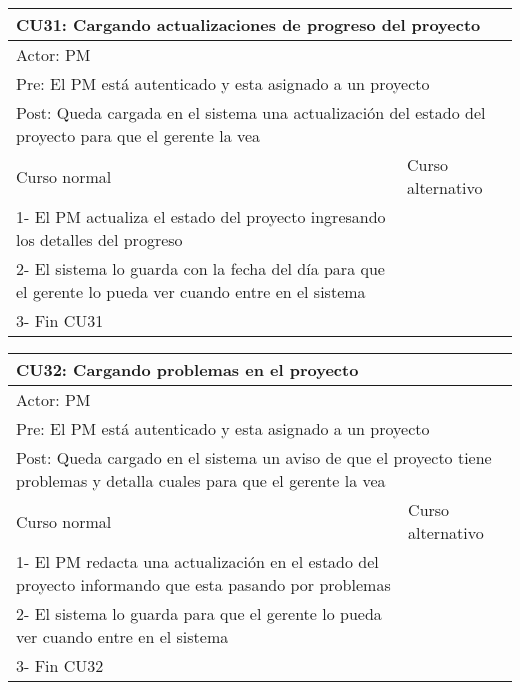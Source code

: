 \begin{table}[H]
  \begin{adjustbox}{max width = \textwidth}
  \begin{tabular}{|l|l|}
    \hline
    \multicolumn{2}{|l|}{CU31: Cargando actualizaciones de progreso del proyecto
} \\\hline
    \multicolumn{2}{|l|}{Actor: PM} \\\hline
    \multicolumn{2}{|l|}{Pre: El PM está autenticado y esta asignado a un proyecto} \\\hline
    \multicolumn{2}{|l|}{Post: Queda cargada en el sistema una actualización del estado del proyecto para que el gerente la vea} \\\hline
     Curso normal & Curso alternativo\\ \hline
	 1- El PM actualiza el estado del proyecto ingresando los detalles del progreso & \\ \hline
   2- El sistema lo guarda con la fecha del día para que el gerente lo pueda ver cuando entre en el sistema & \\ \hline
   3- Fin CU31 & \\ \hline
  \end{tabular}
  \end{adjustbox}
\end{table}

\begin{table}[H]
  \begin{adjustbox}{max width = \textwidth}
  \begin{tabular}{|l|l|}
    \hline
    \multicolumn{2}{|l|}{CU32: Cargando problemas en el proyecto
} \\\hline
    \multicolumn{2}{|l|}{Actor: PM} \\\hline
    \multicolumn{2}{|l|}{Pre: El PM está autenticado y esta asignado a un proyecto} \\\hline
    \multicolumn{2}{|l|}{Post: Queda cargado en el sistema un aviso de que el proyecto tiene problemas y detalla cuales para que el gerente la vea} \\\hline
     Curso normal & Curso alternativo\\ \hline
	 1- El PM redacta una actualización en el estado del proyecto informando que esta pasando por problemas & \\ \hline
   2- El sistema lo guarda para que el gerente lo pueda ver cuando entre en el sistema & \\ \hline
   3- Fin CU32 & \\ \hline
  \end{tabular}
  \end{adjustbox}
\end{table}

